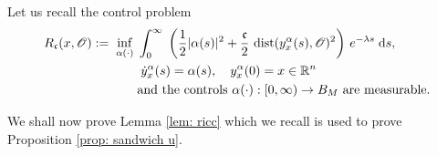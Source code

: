 \documentclass[12pt]{amsart}
\newcommand{\D}[1]{\mbox{\rm #1}}
\newcommand{\dd}{\D{d}}
\numberwithin{equation}{section}
\theoremstyle{plain}
\begin{document}
Let us recall the control problem 
\begin{equation}\label{OCP riccati app}
\begin{aligned}
    R_{\mathfrak{c}}(x,\mathscr{O}) := \; 
    \inf\limits_{\alpha(\cdot)} \; & \int_{0}^{\infty}\; \left(\frac{1}{2}|\alpha(s)|^{2} + \frac{\mathfrak{c}}{2}\,\operatorname{dist}(y_{x}^{\alpha}(s),\mathscr{O})^{2}\right)\, e^{-\lambda s}\;\dd s,\\
    & \; \dot{y}_{x}^{\alpha}(s) = \alpha(s),\quad y_{x}^{\alpha}(0)=x\in\mathbb{R}^n\\
    & \text{and the controls } \alpha(\cdot):[0,\infty) \to B_{M} \text{ are measurable}. 
\end{aligned}
\end{equation}

We shall now prove Lemma \ref{lem: ricc} which we recall is used to prove Proposition \ref{prop: sandwich u}.
\end{document}
